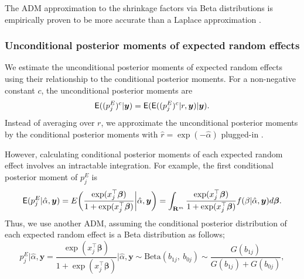 \documentclass[article]{jss}
\begin{document}
The ADM approximation to the shrinkage factors via Beta distributions is empirically proven to be more accurate than a Laplace approximation \citep{carl1988, morris1997, tang2011, morris2012}.




\subsubsection{Unconditional posterior moments of expected random effects}
We estimate the unconditional posterior moments of expected random effects using their relationship to the conditional posterior moments. For a non-negative constant $c$, the unconditional posterior moments are
\begin{equation}
\mathsf{E}((p^E_j)^c\vert\boldsymbol{y})=\mathsf{E}(\mathsf{E}((p^E_j)^c\vert r, \boldsymbol{y})\vert\boldsymbol{y}).
\end{equation}
Instead of averaging over $r$, we approximate the unconditional posterior moments by the conditional posterior moments with $\hat{r}=\exp(-\hat{\alpha})$ plugged-in \citep{kass1989approximate}.

However, calculating conditional posterior moments of each expected random effect involves an intractable integration. For example, the first conditional posterior moment of $p^E_j$ is
\begin{equation}\label{priormoment1}
\mathsf{E}(p^E_{j}\vert\hat{\alpha}, \boldsymbol{y})=E\bigg(\frac{\exp(x_j^\top\boldsymbol{\beta})}{1+\exp(x_j^\top\boldsymbol{\beta})}\bigg\vert\hat{\alpha}, \boldsymbol{y}\bigg)=\int_{\mathbf{R}^{m}} \frac{\exp(x_j^\top\boldsymbol{\beta})}{1+\exp(x_j^\top\boldsymbol{\beta})}f(\beta\vert\hat{\alpha}, \boldsymbol{y})d\boldsymbol{\beta}.
\end{equation}
Thus, we use another ADM, assuming the conditional posterior distribution of each expected random effect is a Beta distribution as follows;
\begin{equation}\label{admpriormean}
p^E_{j}\vert\hat{\alpha}, \boldsymbol{y}=\frac{\exp(x_j^\top\boldsymbol{\beta})}{1+\exp(x_j^\top\boldsymbol{\beta})}\bigg\vert\hat{\alpha}, \boldsymbol{y}\sim \textrm{Beta}(b_{1j},~ b_{0j})\sim \frac{G(b_{1j})}{G(b_{1j})+G(b_{0j})},
\end{equation}
\end{document}
